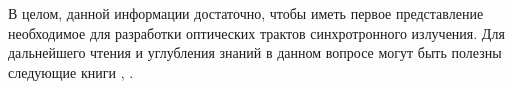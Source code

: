 В целом, данной информации достаточно, чтобы иметь первое представление необходимое для разработки оптических трактов синхротронного излучения. Для дальнейшего чтения и углубления знаний в данном вопросе могут быть полезны следующие книги \cite{als2011elements}, \cite{authier2006dynamical}.


